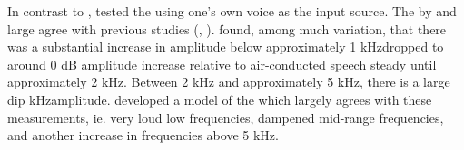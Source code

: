 In contrast to \DIFdelbegin {}\DIFdelend \DIFaddbegin {}\DIFaddend , \cite{hansen:97b} tested the \DIFdelbegin {}\DIFdelend \DIFaddbegin {}\DIFaddend using one's own voice as the input source.  %
%
%
The \DIFdelbegin {}\DIFdelend \DIFaddbegin {}\DIFaddend %
\DIFdelbegin {}\DIFdelend by and large \DIFdelbegin \DIFdel{, }\DIFdelend agree with %
previous studies (\cite{wimmer:86}, \DIFdelbegin {}\DIFdelend \DIFaddbegin {}\DIFaddend ).  \cite{hansen:97b} found, among much variation, that there was a substantial increase in amplitude below approximately 1 kHz\DIFdelbegin {}\DIFdelend \DIFaddbegin {}\DIFaddend dropped to around 0 dB amplitude increase relative to air-conducted speech \DIFdelbegin {}\DIFdelend \DIFaddbegin {}\DIFaddend steady until approximately 2 kHz.  Between 2 kHz and approximately 5 kHz, there is a large dip\DIFdelbegin {}\DIFdelend \DIFaddbegin {} kHz\DIFdelbegin {}\DIFdelend \DIFaddbegin {}\DIFaddend amplitude.  \cite{hansen:97b} developed a model of the \DIFdelbegin {}\DIFdelend \DIFaddbegin {}\DIFaddend which largely agrees with these measurements, ie. very loud low frequencies, dampened mid-range frequencies, and another increase in frequencies above 5 kHz.

